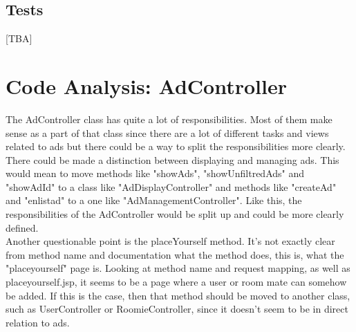 \documentclass{scrreprt}
\begin{document}
\section{Tests}
[TBA]

\chapter{Code Analysis: AdController}
The AdController class has quite a lot of responsibilities. Most of them make sense as a part of that class since there are a lot of different tasks and views related to ads but there could be a way to split the responsibilities more clearly. There could be made a distinction between displaying and managing ads. This would mean to move methods like "showAds", "showUnfiltredAds" and "showAdId" to a class like "AdDisplayController" and methods like "createAd" and "enlistad" to a one like "AdManagementController". Like this, the responsibilities of the AdController would be split up and could be more clearly defined. \\

Another questionable point is the placeYourself method. It's not exactly clear from method name and documentation what the method does, this is, what the "placeyourself" page is. Looking at method name and request mapping, as well as placeyourself.jsp, it seems to be a page where a user or room mate can somehow be added. If this is the case, then that method should be moved to another class, such as UserController or RoomieController, since it doesn't seem to be in direct relation to ads.
\end{document}
